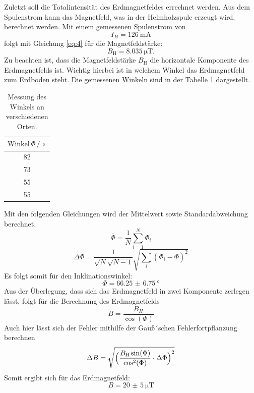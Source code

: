 Zuletzt soll die Totalintensität des Erdmagnetfeldes errechnet werden.
Aus dem Spulenstrom kann das Magnetfeld, was in der Helmholzspule erzeugt wird,
berechnet werden.
Mit einem gemessenen Spulenstrom von
\begin{equation*}
  I_H =\SI{126}{\milli\ampere}
\end{equation*}
folgt mit Gleichung \ref{eq:4} für die Magnetfeldstärke:
\begin{equation*}
  B_\text{H} =\SI{8.035}{\micro\tesla}.
\end{equation*}
Zu beachten ist, dass die Magnetfeldstärke $B_\text{H}$ die horizontale Komponente des Erdmagnetfelds ist.
Wichtig hierbei ist in welchem Winkel das Erdmagnetfeld zum Erdboden steht.
Die gemessenen Winkeln sind in der Tabelle \ref{tab:7} dargestellt.
\begin{table}[H]
  \centering
  \caption{Messung des Winkels an verschiedenen Orten.}
  \label{tab:7}
  \begin{tabular}{c}
\toprule
$\text{Winkel}\, \Phi \,/\, \circ$\\
\midrule
82\\
73\\
55\\
55\\
\bottomrule
  \end{tabular}
\end{table}
Mit den folgenden Gleichungen wird der Mittelwert sowie Standardabweichung berechnet.
\begin{equation*}
  \bar{\Phi}= \frac{1}{N} \sum_{i=1}^{N} \Phi_{i}
\end{equation*}
\begin{equation*}
\Delta \bar{\Phi} = \frac{1}{\sqrt{N}\sqrt{N-1}} \sqrt{\sum_{i}(\Phi_{i}-\bar{\Phi})^2}
\end{equation*}
Es folgt somit für den Inklinationswinkel:
\begin{equation*}
  \Phi = \SI{66.25(675)}{\degree}
\end{equation*}
Aus der Überlegung, dass sich das Erdmagnetfeld in zwei Komponente zerlegen lässt, folgt für die Berechnung des Erdmagnetfelds
\begin{equation*}
  B = \frac{B_H}{\cos(\Phi)}
\end{equation*}
Auch hier lässt sich der Fehler mithilfe der Gauß´schen Fehlerfortpflanzung berechnen
\begin{equation*}
  \Delta B = \sqrt{\Bigl(\frac{B_\text{H} \sin(\Phi)}{\cos^2(\Phi)} \cdot \Delta \Phi\Bigr)^2}
\end{equation*}
Somit ergibt sich für das Erdmagnetfeld:
\begin{equation*}
  B= \SI{20(5)}{\micro\tesla}
\end{equation*}
